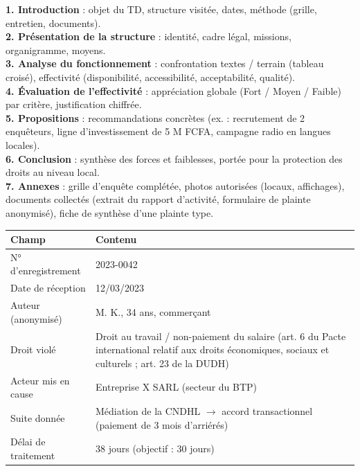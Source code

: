 \documentclass[11pt]{article}
\begin{document}
\begin{methode}
\textbf{1. Introduction} : objet du TD, structure visitée, dates, méthode (grille, entretien, documents).\\
\textbf{2. Présentation de la structure} : identité, cadre légal, missions, organigramme, moyens.\\
\textbf{3. Analyse du fonctionnement} : confrontation textes / terrain (tableau croisé), effectivité (disponibilité, accessibilité, acceptabilité, qualité).\\
\textbf{4. Évaluation de l'effectivité} : appréciation globale (Fort / Moyen / Faible) par critère, justification chiffrée.\\
\textbf{5. Propositions} : recommandations concrètes (ex. : recrutement de 2 enquêteurs, ligne d'investissement de 5 M FCFA, campagne radio en langues locales).\\
\textbf{6. Conclusion} : synthèse des forces et faiblesses, portée pour la protection des droits au niveau local.\\
\textbf{7. Annexes} : grille d'enquête complétée, photos autorisées (locaux, affichages), documents collectés (extrait du rapport d'activité, formulaire de plainte anonymisé), fiche de synthèse d'une plainte type.
\end{methode}

\begin{aretenir}
\begin{center}
\begin{tabularx}{\linewidth}{|l|X|}\hline
\textbf{Champ} & \textbf{Contenu} \\ \hline
N° d'enregistrement & 2023-0042 \\ \hline
Date de réception & 12/03/2023 \\ \hline
Auteur (anonymisé) & M. K., 34 ans, commerçant \\ \hline
Droit violé & Droit au travail / non-paiement du salaire (art. 6 du Pacte international relatif aux droits économiques, sociaux et culturels ; art. 23 de la DUDH) \\ \hline
Acteur mis en cause & Entreprise X SARL (secteur du BTP) \\ \hline
Suite donnée & Médiation de la CNDHL $\rightarrow$ accord transactionnel (paiement de 3 mois d'arriérés) \\ \hline
Délai de traitement & 38 jours (objectif : 30 jours) \\ \hline
\end{tabularx}
\end{center}
\end{aretenir}
\end{document}
